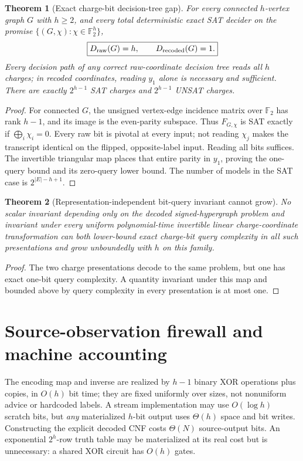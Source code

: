 \documentclass[11pt]{article}
\newtheorem{theorem}{Theorem}
\begin{document}
\begin{theorem}[Exact charge-bit decision-tree gap]
For every connected $h$-vertex graph $G$ with $h\ge2$, and every total deterministic exact SAT decider on the promise $\{(G,\chi):\chi\in\mathbb F_2^h\}$,
\[
\boxed{D_{\rm raw}(G)=h,\qquad D_{\rm recoded}(G)=1.}
\]
Every decision path of any correct raw-coordinate decision tree reads all $h$ charges; in recoded coordinates, reading $y_1$ alone is necessary and sufficient. There are exactly $2^{h-1}$ SAT charges and $2^{h-1}$ UNSAT charges.
\end{theorem}
\begin{proof}
For connected $G$, the unsigned vertex-edge incidence matrix over $\mathbb F_2$ has rank $h-1$, and its image is the even-parity subspace. Thus $F_{G,\chi}$ is SAT exactly if $\bigoplus_i\chi_i=0$. Every raw bit is pivotal at every input; not reading $\chi_j$ makes the transcript identical on the flipped, opposite-label input. Reading all bits suffices. The invertible triangular map places that entire parity in $y_1$, proving the one-query bound and its zero-query lower bound. The number of models in the SAT case is $2^{|E|-h+1}$.
\end{proof}

\begin{theorem}[Representation-independent bit-query invariant cannot grow]
No scalar invariant depending only on the decoded signed-hypergraph problem and invariant under every uniform polynomial-time invertible linear charge-coordinate transformation can both lower-bound exact charge-bit query complexity in \emph{all} such presentations and grow unboundedly with $h$ on this family.
\end{theorem}
\begin{proof}
The two charge presentations decode to the same problem, but one has exact one-bit query complexity. A quantity invariant under this map and bounded above by query complexity in every presentation is at most one.
\end{proof}

\section*{Source-observation firewall and machine accounting}
The encoding map and inverse are realized by $h-1$ binary XOR operations plus copies, in $O(h)$ bit time; they are fixed uniformly over sizes, not nonuniform advice or hardcoded labels. A stream implementation may use $O(\log h)$ scratch bits, but \emph{any} materialized $h$-bit output uses $\Theta(h)$ space and bit writes. Constructing the explicit decoded CNF costs $\Theta(N)$ source-output bits. An exponential $2^h$-row truth table may be materialized at its real cost but is unnecessary: a shared XOR circuit has $O(h)$ gates.
\end{document}
